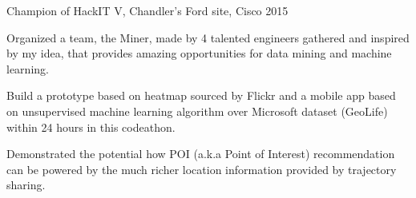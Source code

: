 
\begin{cventries}
  \cventryXx
    {Champion of HackIT V, Chandler's Ford site, Cisco}
    {2015}
    {
      \begin{cvitems}
        \item {Organized a team, the Miner, made by 4 talented engineers gathered and inspired by my idea, that  provides amazing opportunities for data mining and machine learning.}
        \item {Build a prototype based on heatmap sourced by Flickr and a mobile app based on unsupervised machine learning algorithm over Microsoft dataset (GeoLife) within 24 hours in this codeathon.}
        \item{Demonstrated the potential how POI (a.k.a Point of Interest) recommendation can be powered by the much richer location information provided by trajectory sharing.}
      \end{cvitems}
    }
\end{cventries}
